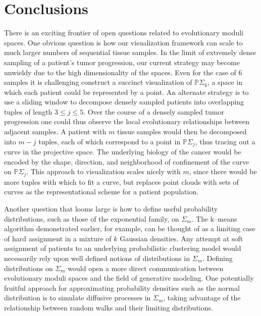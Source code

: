\documentclass[a4paper,11pt]{article}
\begin{document}

\section{Conclusions}\label{sec:conclusions}

There is an exciting frontier of open questions related to evolutionary moduli spaces.
One obvious question is how our visualization framework can scale to much larger numbers of sequential tissue samples.
In the limit of extremely dense sampling of a patient's tumor progression, our current strategy may become unwieldy due to the high dimensionality of the spaces.
Even for the case of 6 samples it is challenging construct a succinct visualization of $\mathbb{P}\Sigma_6$, a space in which each patient could be represented by a point.
An alternate strategy is to use a sliding window to decompose densely sampled patients into overlapping tuples of length $3 \leq j \leq 5$.
Over the course of a densely sampled tumor progression one could thus observe the local evolutionary relationships between adjacent samples.
A patient with $m$ tissue samples would then be decomposed into $m - j$ tuples, each of which correspond to a point in $\mathbb{P}\Sigma_j$, thus tracing out a curve in the projective space.
The underlying biology of the cancer would be encoded by the shape, direction, and neighborhood of confinement of the curve on $\mathbb{P}\Sigma_j$.
This approach to visualization scales nicely with $m$, since there would be more tuples with which to fit a curve, but replaces point clouds with sets of curves as the representational scheme for a patient population.

Another question that looms large is how to define useful probability distributions, such as those of the exponential family, on $\Sigma_m$.
The k--means algorithm demonstrated earlier, for example, can be thought of as a limiting case of hard assignment in a mixture of $k$ Gaussian densities.
Any attempt at soft assignment of patients to an underlying probabilistic clustering model would necessarily rely upon well defined notions of distributions in $\Sigma_m$.
Defining distributions on $\Sigma_m$ would open a more direct communication between evolutionary moduli spaces and the field of generative modeling.
One potentially fruitful approach for approximating probability densities such as the normal distribution is to simulate diffusive processes in $\Sigma_m$, taking advantage of the relationship between random walks and their limiting distributions.
\end{document}
